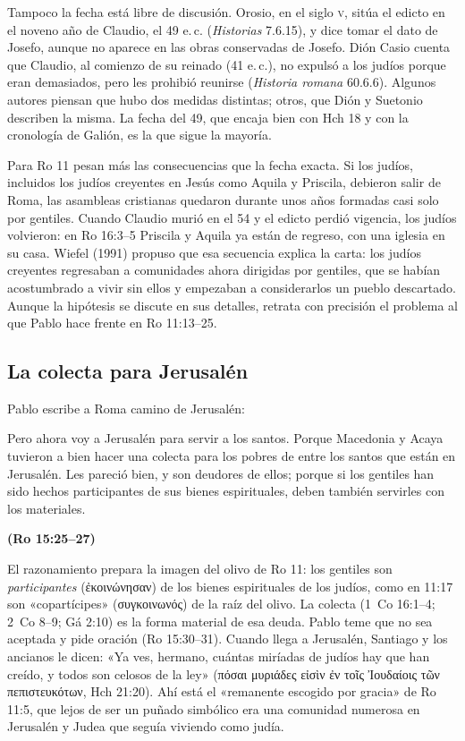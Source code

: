 \documentclass[11pt,letterpaper]{article}
\newcommand{\grc}[1]{\foreignlanguage{ancientgreek}{#1}}
\newcommand{\fuente}[1]{\par\hfill{\upshape\bfseries\small\textcolor{ladrillo}{#1}}}
\begin{document}
Tampoco la fecha está libre de discusión. Orosio, en el siglo \textsc{v}, sitúa el edicto en el noveno año de Claudio, el 49 e.\,c. (\emph{Historias} 7.6.15), y dice tomar el dato de Josefo, aunque no aparece en las obras conservadas de Josefo. Dión Casio cuenta que Claudio, al comienzo de su reinado (41 e.\,c.), no expulsó a los judíos porque eran demasiados, pero les prohibió reunirse (\emph{Historia romana} 60.6.6). Algunos autores piensan que hubo dos medidas distintas; otros, que Dión y Suetonio describen la misma. La fecha del 49, que encaja bien con Hch 18 y con la cronología de Galión, es la que sigue la mayoría.

Para Ro 11 pesan más las consecuencias que la fecha exacta. Si los judíos, incluidos los judíos creyentes en Jesús como Aquila y Priscila, debieron salir de Roma, las asambleas cristianas quedaron durante unos años formadas casi solo por gentiles. Cuando Claudio murió en el 54 y el edicto perdió vigencia, los judíos volvieron: en Ro 16:3--5 Priscila y Aquila ya están de regreso, con una iglesia en su casa. Wiefel (1991) propuso que esa secuencia explica la carta: los judíos creyentes regresaban a comunidades ahora dirigidas por gentiles, que se habían acostumbrado a vivir sin ellos y empezaban a considerarlos un pueblo descartado. Aunque la hipótesis se discute en sus detalles, retrata con precisión el problema al que Pablo hace frente en Ro 11:13--25.

\subsection{La colecta para Jerusalén}
Pablo escribe a Roma camino de Jerusalén:
\begin{cita}Pero ahora voy a Jerusalén para servir a los santos. Porque Macedonia y Acaya tuvieron a bien hacer una colecta para los pobres de entre los santos que están en Jerusalén. Les pareció bien, y son deudores de ellos; porque si los gentiles han sido hechos participantes de sus bienes espirituales, deben también servirles con los materiales.\fuente{(Ro 15:25--27)}\end{cita}
El razonamiento prepara la imagen del olivo de Ro 11: los gentiles son \emph{participantes} (\grc{ἐκοινώνησαν}) de los bienes espirituales de los judíos, como en 11:17 son «copartícipes» (\grc{συγκοινωνός}) de la raíz del olivo. La colecta (1~Co 16:1--4; 2~Co 8--9; Gá 2:10) es la forma material de esa deuda. Pablo teme que no sea aceptada y pide oración (Ro 15:30--31). Cuando llega a Jerusalén, Santiago y los ancianos le dicen: «Ya ves, hermano, cuántas miríadas de judíos hay que han creído, y todos son celosos de la ley» (\grc{πόσαι μυριάδες εἰσὶν ἐν τοῖς Ἰουδαίοις τῶν πεπιστευκότων}, Hch 21:20). Ahí está el «remanente escogido por gracia» de Ro 11:5, que lejos de ser un puñado simbólico era una comunidad numerosa en Jerusalén y Judea que seguía viviendo como judía.
\end{document}
